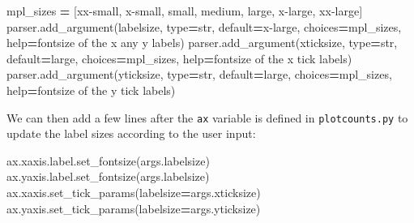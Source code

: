\documentclass[
]{krantz}
\makeatletter
\newenvironment{Shaded}{\begin{snugshade}}{\end{snugshade}}
\newcommand{\BuiltInTok}[1]{#1}
\newcommand{\NormalTok}[1]{#1}
\newcommand{\OperatorTok}[1]{\textcolor[rgb]{0.81,0.36,0.00}{\textbf{#1}}}
\newcommand{\StringTok}[1]{\textcolor[rgb]{0.31,0.60,0.02}{#1}}
\newenvironment{kframe}{%
\medskip{}
\setlength{\fboxsep}{.8em}
 \def\at@end@of@kframe{}%
 \ifinner\ifhmode%
  \def\at@end@of@kframe{\end{minipage}}%
  \begin{minipage}{\columnwidth}%
 \fi\fi%
 \def\FrameCommand##1{\hskip\@totalleftmargin \hskip-\fboxsep
 \colorbox{shadecolor}{##1}\hskip-\fboxsep
     \hskip-\linewidth \hskip-\@totalleftmargin \hskip\columnwidth}%
 \MakeFramed {\advance\hsize-\width
   \@totalleftmargin\z@ \linewidth\hsize
   \@setminipage}}%
 {\par\unskip\endMakeFramed%
 \at@end@of@kframe}
\renewenvironment{Shaded}{\begin{kframe}}{\end{kframe}}
\makeatother
\begin{document}
\begin{Shaded}
\begin{Highlighting}[]
\NormalTok{mpl\_sizes }\OperatorTok{=}\NormalTok{ [}\StringTok{\textquotesingle{}xx{-}small\textquotesingle{}}\NormalTok{, }\StringTok{\textquotesingle{}x{-}small\textquotesingle{}}\NormalTok{, }\StringTok{\textquotesingle{}small\textquotesingle{}}\NormalTok{, }\StringTok{\textquotesingle{}medium\textquotesingle{}}\NormalTok{, }\StringTok{\textquotesingle{}large\textquotesingle{}}\NormalTok{, }\StringTok{\textquotesingle{}x{-}large\textquotesingle{}}\NormalTok{, }\StringTok{\textquotesingle{}xx{-}large\textquotesingle{}}\NormalTok{]}
\NormalTok{parser.add\_argument(}\StringTok{\textquotesingle{}{-}{-}labelsize\textquotesingle{}}\NormalTok{, }\BuiltInTok{type}\OperatorTok{=}\BuiltInTok{str}\NormalTok{, default}\OperatorTok{=}\StringTok{\textquotesingle{}x{-}large\textquotesingle{}}\NormalTok{, choices}\OperatorTok{=}\NormalTok{mpl\_sizes,}
                    \BuiltInTok{help}\OperatorTok{=}\StringTok{\textquotesingle{}fontsize of the x any y labels\textquotesingle{}}\NormalTok{)}
\NormalTok{parser.add\_argument(}\StringTok{\textquotesingle{}{-}{-}xticksize\textquotesingle{}}\NormalTok{, }\BuiltInTok{type}\OperatorTok{=}\BuiltInTok{str}\NormalTok{, default}\OperatorTok{=}\StringTok{\textquotesingle{}large\textquotesingle{}}\NormalTok{, choices}\OperatorTok{=}\NormalTok{mpl\_sizes,}
                    \BuiltInTok{help}\OperatorTok{=}\StringTok{\textquotesingle{}fontsize of the x tick labels\textquotesingle{}}\NormalTok{)}
\NormalTok{parser.add\_argument(}\StringTok{\textquotesingle{}{-}{-}yticksize\textquotesingle{}}\NormalTok{, }\BuiltInTok{type}\OperatorTok{=}\BuiltInTok{str}\NormalTok{, default}\OperatorTok{=}\StringTok{\textquotesingle{}large\textquotesingle{}}\NormalTok{, choices}\OperatorTok{=}\NormalTok{mpl\_sizes,}
                    \BuiltInTok{help}\OperatorTok{=}\StringTok{\textquotesingle{}fontsize of the y tick labels\textquotesingle{}}\NormalTok{)}
\end{Highlighting}
\end{Shaded}

We can then add a few lines after the \texttt{ax} variable is defined in \texttt{plotcounts.py}
to update the label sizes according to the user input:

\begin{Shaded}
\begin{Highlighting}[]
\NormalTok{ax.xaxis.label.set\_fontsize(args.labelsize)}
\NormalTok{ax.yaxis.label.set\_fontsize(args.labelsize)}
\NormalTok{ax.xaxis.set\_tick\_params(labelsize}\OperatorTok{=}\NormalTok{args.xticksize)}
\NormalTok{ax.yaxis.set\_tick\_params(labelsize}\OperatorTok{=}\NormalTok{args.yticksize)}
\end{Highlighting}
\end{Shaded}
\end{document}
